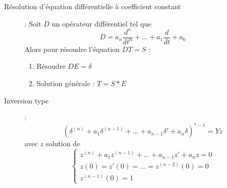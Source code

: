 \begin{description}
\[    \]
\item[Résolution d’équation différentielle à coefficient constant] : Soit $D$ un opérateur différentiel tel que
    \[ D=a_n\frac{d^n}{dt^n}+\dots+a_1\frac{d}{dt}+a_0 \]
    Alors pour résoudre l'équation $DT=S$ :
    \begin{enumerate}
        \item Résoudre $DE=\delta$
        \item Solution générale : $T=S*E$
    \end{enumerate}
\item[Inversion type] :
    \[
        \left(
           \delta^{(n)}+a_1\delta^{(n-1)}+\dots+a_{n-1}\delta'+a_n\delta
        \right)^{*-1}
        =Yz
    \]
    avec $z$ solution de
    \[
        \begin{cases}
            z^{(n)}+a_1z^{(n-1)}+\dots+a_{n-1}z'+a_nz=0\\
            z(0)=z'(0)=\dots=z^{(n-2)}(0)=0\\
            z^{(n-1)}(0)=1
        \end{cases}
    \]
\end{description}
